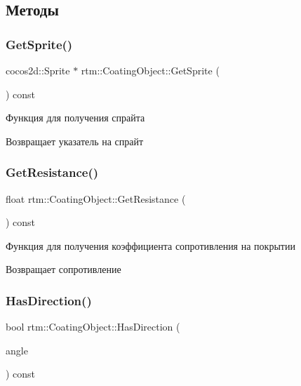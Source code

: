 \subsection{Методы}
\mbox{\label{classrtm_1_1_coating_object_a5153c2be68353078dac8771cc9c361bb}} 
\subsubsection{\texorpdfstring{Get\+Sprite()}{GetSprite()}}
{\footnotesize\ttfamily cocos2d\+::\+Sprite $\ast$ rtm\+::\+Coating\+Object\+::\+Get\+Sprite (\begin{DoxyParamCaption}{ }\end{DoxyParamCaption}) const}

Функция для получения спрайта \begin{DoxyReturn}{Возвращает}
указатель на спрайт 
\end{DoxyReturn}
\mbox{\label{classrtm_1_1_coating_object_a1680b004da834a1b885b4e22f09e84cc}} 
\subsubsection{\texorpdfstring{Get\+Resistance()}{GetResistance()}}
{\footnotesize\ttfamily float rtm\+::\+Coating\+Object\+::\+Get\+Resistance (\begin{DoxyParamCaption}{ }\end{DoxyParamCaption}) const}

Функция для получения коэффициента сопротивления на покрытии \begin{DoxyReturn}{Возвращает}
сопротивление 
\end{DoxyReturn}
\mbox{\label{classrtm_1_1_coating_object_a88eb5287d899ca8e10e31de4192bbddc}} 
\subsubsection{\texorpdfstring{Has\+Direction()}{HasDirection()}}
{\footnotesize\ttfamily bool rtm\+::\+Coating\+Object\+::\+Has\+Direction (\begin{DoxyParamCaption}\item[{\hyperlink{namespacertm_a69dc82b16a0148c10962caa83d930f89}{Angle\+Type}}]{angle }\end{DoxyParamCaption}) const}

